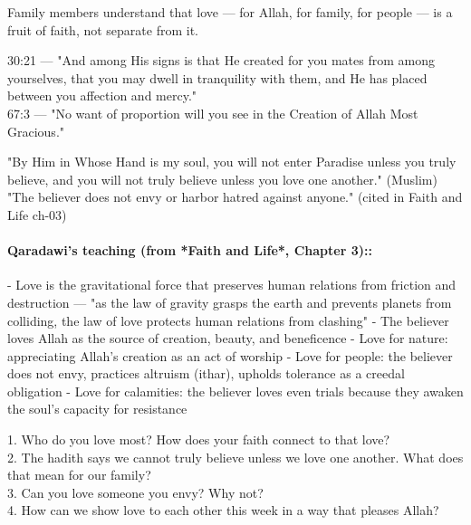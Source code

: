 \documentclass[11pt,a4paper]{article}
\begin{document}
\begin{outcomebox} Family members understand that love --- for Allah, for family, for people --- is a fruit of faith, not separate from it. \end{outcomebox}

\begin{quranbox} 30:21 --- "And among His signs is that He created for you mates from among yourselves, that you may dwell in tranquility with them, and He has placed between you affection and mercy." \\ 67:3 --- "No want of proportion will you see in the Creation of Allah Most Gracious." \end{quranbox}

\begin{hadithbox} "By Him in Whose Hand is my soul, you will not enter Paradise unless you truly believe, and you will not truly believe unless you love one another." (Muslim) \\ "The believer does not envy or harbor hatred against anyone." (cited in Faith and Life ch-03) \end{hadithbox}

\paragraph*{Qaradawi's teaching (from *Faith and Life*, Chapter 3)::}  - Love is the gravitational force that preserves human relations from friction and destruction --- "as the law of gravity grasps the earth and prevents planets from colliding, the law of love protects human relations from clashing" - The believer loves Allah as the source of creation, beauty, and beneficence - Love for nature: appreciating Allah's creation as an act of worship - Love for people: the believer does not envy, practices altruism (ithar), upholds tolerance as a creedal obligation - Love for calamities: the believer loves even trials because they awaken the soul's capacity for resistance

\begin{discussionbox} 1. Who do you love most? How does your faith connect to that love? \\ 2. The hadith says we cannot truly believe unless we love one another. What does that mean for our family? \\ 3. Can you love someone you envy? Why not? \\ 4. How can we show love to each other this week in a way that pleases Allah? \end{discussionbox}
\end{document}
